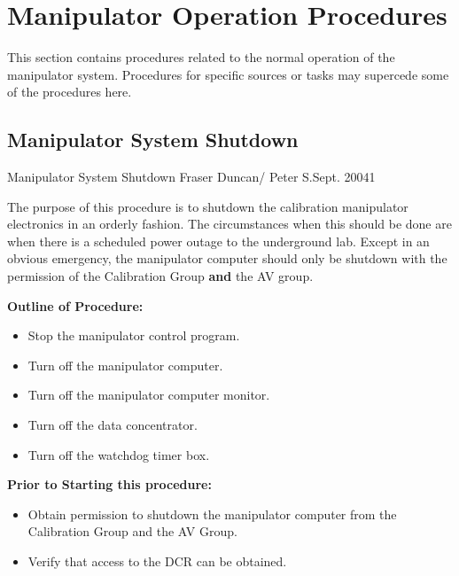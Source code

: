   
\section{Manipulator Operation Procedures}
 
  This section contains procedures related to the normal operation
of the manipulator system.  Procedures for specific sources or
tasks may supercede some of the procedures here.



\newpage
\subsection{Manipulator System Shutdown}


             {Manipulator System Shutdown}
             {Fraser Duncan/ Peter S.}{Sept. 2004}{1}


  
  The purpose of this procedure is to shutdown the calibration manipulator
electronics in an orderly fashion.  The circumstances when this should be
done are when there is a scheduled power outage to the underground lab.
Except in an obvious emergency, the manipulator computer should only be
shutdown with the permission of the Calibration Group {\bf and} the AV group.
  
\noindent
{\bf Outline of Procedure:}
\begin{itemize}
  
\item Stop the manipulator control program.
  
\item Turn off the manipulator computer.
  
\item Turn off the manipulator computer monitor.
  
\item Turn off the data concentrator.
  
\item Turn off the watchdog timer box.

\end{itemize}  

\noindent  
{\bf Prior to Starting this procedure:}
\begin{itemize}
   
\item Obtain permission to shutdown the manipulator computer from 
    the Calibration Group and the AV Group.
  
\item Verify that access to the DCR can be obtained.
\end{itemize}
  
